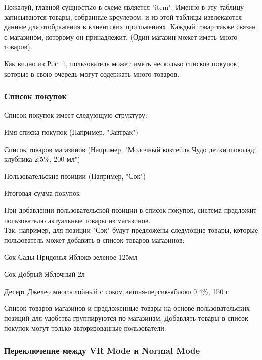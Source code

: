 Пожалуй, главной сущностью в схеме является "item". Именно в эту таблицу
записываются товары, собранные кроулером, и из этой таблицы извлекаются данные
для отображения в клиентских приложениях. Каждый товар также связан с
магазином, которому он принадлежит. (Один магазин может иметь много товаров).

Как видно из Рис. 1, пользователь может иметь несколько списков покупок,
которые в свою очередь могут содержать много товаров.

\subsubsection{Список покупок}
Список покупок имеет следующую структуру:
\begin{my_enumerate}
  \item Имя списка покупок (Например, "Завтрак")
  \item Список товаров магазинов (Например, "Молочный коктейль Чудо детки
    шоколад; клубника 2,5\%, 200 мл")
  \item Пользовательские позиции (Например, "Сок")
  \item Итоговая сумма покупок
\end{my_enumerate}

При добавлении пользовательской позиции в список покупок, система предложит
пользователю актуальные товары из магазинов.\\
Так, например, для позиции "Сок" будут предложены следующие товары, 
которые пользователь может добавить в список товаров магазинов:
\begin{my_enumerate}
\item Сок Сады Придонья Яблоко зеленое 125мл
\item Сок Добрый Яблочный 2л
\item Десерт Джелео многослойный с соком вишня-персик-яблоко 0,4\%, 150 г
\end{my_enumerate}

Список товаров магазинов и предложенные товары на основе пользовательских
позиций для удобства группируются по магазинам.
Добавлять товары в список покупок могут только авторизованные пользователи.


\subsubsection{Переключение между VR Mode и Normal Mode}

